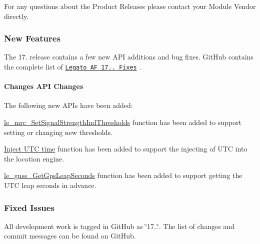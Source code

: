 For any questions about the Product Releases please contact your Module Vendor directly.\hypertarget{releaseNotes17060_rn17_06_Features}{}\subsubsection{New Features}\label{releaseNotes17060_rn17_06_Features}
The 17. release contains a few new A\+PI additions and bug fixes. Git\+Hub contains the complete list of \href{https://github.com/legatoproject/legato-af/commits/17.06.0}{\tt Legato AF 17.. Fixes} .\hypertarget{releaseNotes17060_rn17_06_FeaturesAPI}{}\paragraph{Changes A\+P\+I Changes}\label{releaseNotes17060_rn17_06_FeaturesAPI}
The following new A\+P\+Is have been added\+:
\begin{DoxyItemize}
\item \hyperlink{le__mrc__interface_8h_aa7883e8c1193c7c8efc87b42cd07c502}{le\+\_\+mrc\+\_\+\+Set\+Signal\+Strength\+Ind\+Thresholds} function has been added to support setting or changing new thresholds.
\item \hyperlink{c_gnss_le_gnss_InjectUtcTime}{Inject U\+TC time} function has been added to support the injecting of U\+TC into the location engine.
\item \hyperlink{le__gnss__interface_8h_a9e2b23f2420e53ca86f48a0f0c43f2d0}{le\+\_\+gnss\+\_\+\+Get\+Gps\+Leap\+Seconds} function has been added to support getting the U\+TC leap seconds in advance.
\end{DoxyItemize}\hypertarget{releaseNotes17060_rn17_06_Fixes}{}\subsubsection{Fixed Issues}\label{releaseNotes17060_rn17_06_Fixes}
All development work is tagged in Git\+Hub as \char`\"{}17..\char`\"{}. The list of changes and commit messages can be found on Git\+Hub.

